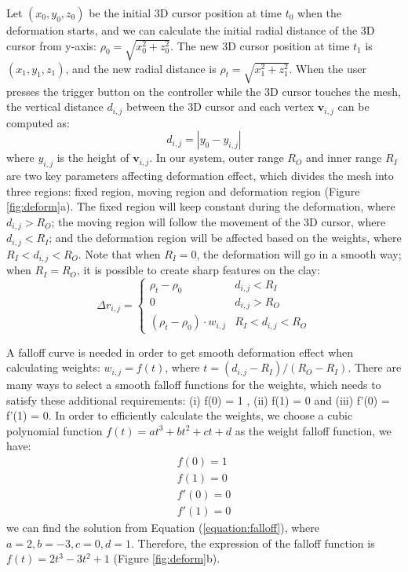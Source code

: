 \documentclass{svjour3}                     %
\begin{document}
Let $(x_{0},y_{0},z_{0})$ be the initial 3D cursor position at time $t_{0}$ when the deformation starts, and we can calculate the initial radial distance of the 3D cursor from y-axis: $\rho_{0} = \sqrt{x_{0}^2 + z_{0}^2}$. The new 3D cursor position at time $t_{1}$ is $(x_{1},y_{1},z_{1})$, and the new radial distance is $\rho_{t} = \sqrt{x_{1}^2 + z_{1}^2}$.
When the user presses the trigger button on the controller while the 3D cursor touches the mesh, the vertical distance $d_{i,j}$ between the 3D cursor and each vertex $\mathbf{v}_{i,j}$ can be computed as:
\begin{equation}
d_{i,j} = |y_{0} - y_{i,j}|
\end{equation}
where $y_{i,j}$ is the height of $\mathbf{v}_{i,j}$.
In our system, outer range $R_{O}$ and inner range $R_{I}$ are two key parameters affecting deformation effect, which divides the mesh into three regions: fixed region, moving region and  deformation region (Figure \ref{fig:deform}a).
The fixed region will keep constant during the deformation, where $d_{i,j} > R_{O}$; the moving region will follow the movement of the 3D cursor, where $d_{i,j} < R_{I}$; and the deformation region will be affected based on the weights, where $R_{I} < d_{i,j} < R_{O}$.
Note that when $R_{I} = 0$, the deformation will go in a smooth way; when $R_{I} = R_{O}$, it is possible to create sharp features on the clay:
\begin{equation}
\Delta r_{i,j} = \begin{cases}
\rho_{t} - \rho_{0} &  d_{i,j} < R_{I} \\
0 &  d_{i,j} > R_{O} \\
(\rho_{t} - \rho_{0}) \cdot w_{i,j} &  R_{I} < d_{i,j} < R_{O}
\end{cases}
\end{equation}

A falloff curve is needed in order to get smooth deformation effect when calculating weights: $w_{i,j} = f(t)$, where $t = (d_{i,j} - R_{I}) / (R_{O} - R_{I})$.
There are many ways to select a smooth falloff functions for the weights, which needs to satisfy these additional requirements: (i) f(0) = 1 , (ii) f(1) = 0 and (iii) f'(0) = f'(1) = 0.
In order to efficiently calculate the weights, we choose a cubic polynomial function $f(t) = at^3 + bt^2 + ct + d$ as the weight falloff function, we have:
\begin{equation}
\begin{aligned}
\label{equation:falloff}
f(0) = 1 \\
f(1) = 0 \\ 
f'(0) = 0 \\
f'(1) = 0
\end{aligned}
\end{equation}
we can find the solution from Equation (\ref{equation:falloff}), where 
$a = 2, b = -3, c = 0, d = 1$. Therefore, the expression of the falloff function is $f(t) = 2t^3 - 3t^2 + 1$ (Figure \ref{fig:deform}b).
\end{document}
